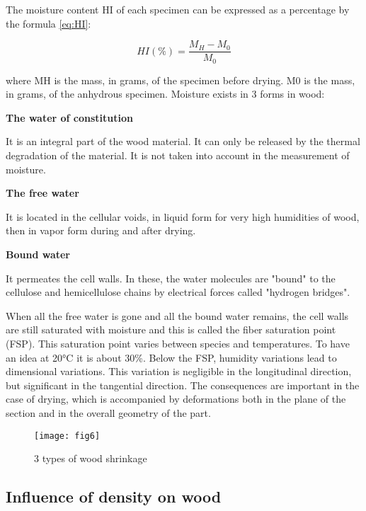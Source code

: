 The moisture content HI of each specimen can be expressed as a percentage by the formula \ref{eq:HI}:

\begin{equation}
	HI(\%) = \frac{M_{H}-M_{0}}{M_{0}}
	\label{eq:HI}
\end{equation}

where MH is the mass, in grams, of the specimen before drying. M0 is the mass, in grams, of the anhydrous specimen. Moisture exists in 3 forms in wood:

\smallskip

\textbf{The water of constitution}

It is an integral part of the wood material. It can only be released by the thermal degradation of the material. It is not taken into account in the measurement of moisture.

\smallskip

\textbf{The free water}

It is located in the cellular voids, in liquid form for very high humidities of wood, then in vapor form during and after drying.

\smallskip

\textbf{Bound water}

It permeates the cell walls. In these, the water molecules are "bound" to the cellulose and hemicellulose chains by electrical forces called "hydrogen bridges".

\smallskip

When all the free water is gone and all the bound water remains, the cell walls are still saturated with moisture and this is called the fiber saturation point (FSP). This saturation point varies between species and temperatures. To have an idea at 20°C it is about 30\%. Below the FSP, humidity variations lead to dimensional variations. This variation is negligible in the longitudinal direction, but significant in the tangential direction. The consequences are important in the case of drying, which is accompanied by deformations both in the plane of the section and in the overall geometry of the part.


\begin{figure}[htp]
	\centering
	\texttt{[image: fig6]}
	\caption{3 types of wood shrinkage}
	\label{fig:galaxy}
\end{figure}

\subsection{Influence of density on wood}

